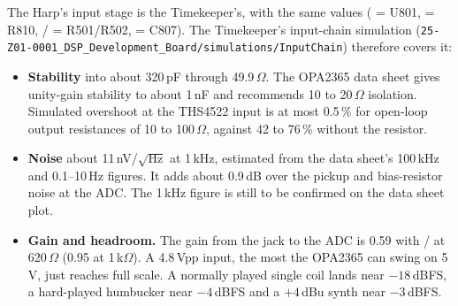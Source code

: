 The Harp's input stage is the Timekeeper's, with the same values ( = U801,  = R810, / = R501/R502,  = C807). The Timekeeper's input-chain simulation (\texttt{25-Z01-0001\_DSP\_Development\_Board/simulations/InputChain}) therefore covers it:

\begin{itemize}
  \item \textbf{Stability} into about 320\,pF through 49.9\,$\Omega$. The OPA2365 data sheet gives unity-gain stability to about 1\,nF and recommends 10 to 20\,$\Omega$ isolation. Simulated overshoot at the THS4522 input is at most 0.5\,\% for open-loop output resistances of 10 to 100\,$\Omega$, against 42 to 76\,\% without the resistor.
  \item \textbf{Noise} about 11\,nV/$\sqrt{\text{Hz}}$ at 1\,kHz, estimated from the data sheet's 100\,kHz and 0.1--10\,Hz figures. It adds about 0.9\,dB over the pickup and bias-resistor noise at the ADC. The 1\,kHz figure is still to be confirmed on the data sheet plot.
  \item \textbf{Gain and headroom.} The gain from the jack to the ADC is 0.59 with / at 620\,$\Omega$ (0.95 at 1\,k$\Omega$). A 4.8\,Vpp input, the most the OPA2365 can swing on 5\,V, just reaches full scale. A normally played single coil lands near $-18$\,dBFS, a hard-played humbucker near $-4$\,dBFS and a $+4$\,dBu synth near $-3$\,dBFS.
\end{itemize}

